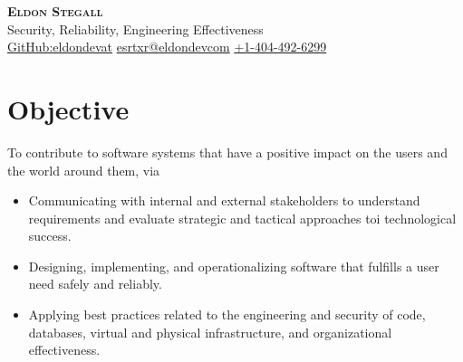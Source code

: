 \documentclass[letterpaper,11pt]{article}
\begin{document}
\begin{center}
	\textbf{\LARGE \scshape Eldon Stegall } \\
	\large
	Security, Reliability, Engineering Effectiveness \\
	\vspace{+3pt}
	\small
	\hspace{.5pt} \href{https://github.com/eldondevat}{\color{blue}GitHub:eldondevat}
	\hspace{.5pt} \href{mailto:esrtxr@eldondevcom}{\color{blue}esrtxr@eldondevcom}
	\hspace{.5pt} \href{tel:+1-404-492-6299}{\color{blue}+1-404-492-6299}
\end{center}


\section{Objective}
To contribute to software systems that have a positive impact on the users and the world around them, via
\begin{itemize}
	\item Communicating with internal and external stakeholders to understand requirements and evaluate strategic and tactical approaches toi technological success.
	\item Designing, implementing, and operationalizing software that fulfills a user need safely and reliably.
	\item Applying best practices related to the engineering and security of code, databases, virtual and physical infrastructure, and organizational effectiveness.
\end{itemize}
\end{document}
